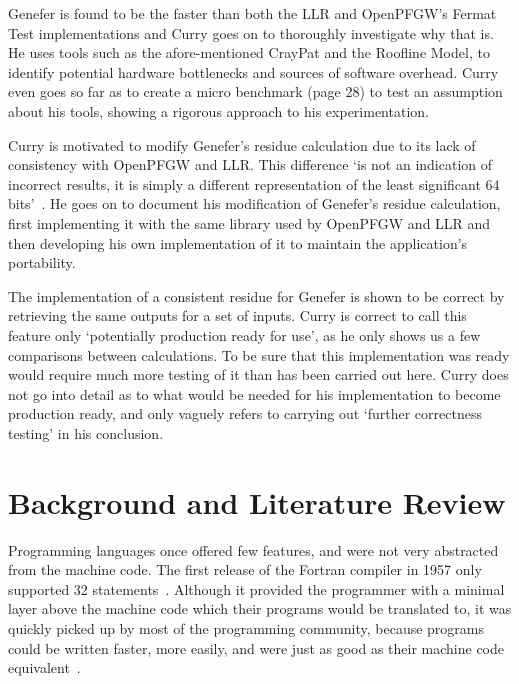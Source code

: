 \documentclass{report}[a4]
\begin{document}
Genefer is found to be the faster than both the LLR and OpenPFGW's Fermat Test implementations and Curry goes on to thoroughly investigate why that is. He uses tools such as the afore-mentioned CrayPat and the Roofline Model, to identify potential hardware bottlenecks and sources of software overhead. Curry even goes so far as to create a micro benchmark (page 28) to test an assumption about his tools, showing a rigorous approach to his experimentation.

Curry is motivated to modify Genefer's residue calculation due to its lack of consistency with OpenPFGW and LLR. This difference `is not an indication of incorrect results, it is simply a different representation of the least significant 64 bits'~\cite{Curry2016}. He goes on to document his modification of Genefer's residue calculation, first implementing it with the same library used by OpenPFGW and LLR and then developing his own implementation of it to maintain the application's portability.

The implementation of a consistent residue for Genefer is shown to be correct by retrieving the same outputs for a set of inputs. Curry is correct to call this feature only `potentially production ready for use', as he only shows us a few comparisons between calculations. To be sure that this implementation was ready would require much more testing of it than has been carried out here. Curry does not go into detail as to what would be needed for his implementation to become production ready, and only vaguely refers to carrying out `further correctness testing' in his conclusion.


\chapter{Background and Literature Review} %
Programming languages once offered few features, and were not very abstracted from the machine code. The first release of the Fortran compiler in 1957 only supported 32 statements~\cite{Backus:1957:FAC:1455567.1455599}. Although it provided the programmer with a minimal layer above the machine code which their programs would be translated to, it was quickly picked up by most of the programming community, because programs could be written faster, more easily, and were just as good as their machine code equivalent~\cite{metcalf2011seven}.
\end{document}
